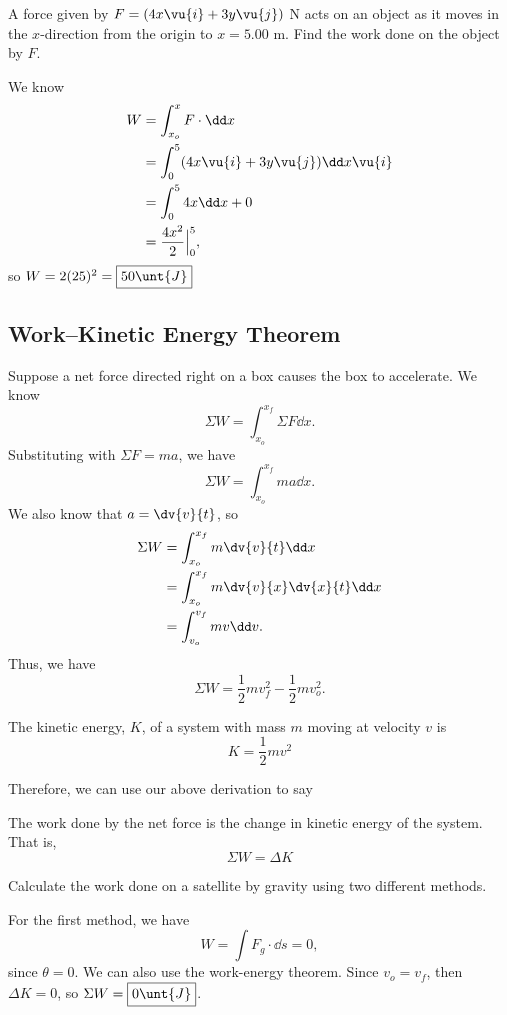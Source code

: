 \documentclass[11pt]{article}
\begin{document}
\begin{example}
	A force given by $F = (4x\vu{i} + 3y\vu{j})$ N acts on an object as it moves in the $x$-direction from the origin to $x = 5.00$ m. Find the work done on the object by $F$.
\end{example}
\begin{solution}
	We know
	\begin{align*}
		W &= \int_{x_o}^{x} F \cdot \dd x \\
		&= \int_0^5 (4x\vu{i} + 3y\vu{j}) \dd x \vu{i} \\
		&= \int_{0}^{5} 4x \dd x + 0 \\
		&= \frac{4x^2}{2} \Big|_0^5,
	\end{align*}
	so $W = 2(25)^2 = \boxed{50 \unt{J}}$
\end{solution}

\subsection{Work--Kinetic Energy Theorem}
Suppose a net force directed right on a box causes the box to accelerate. We know
\[\Sigma W = \int_{x_o}^{x_f} \Sigma F \dd x.\]
Substituting with $\Sigma F = ma$, we have
\[\Sigma W = \int_{x_o}^{x_f} ma \dd x.\]
We also know that $a = \dv{v}{t}$, so
\begin{align*}
	\Sigma W &= \int_{x_o}^{x_f} m \dv{v}{t} \dd x \\
	&= \int_{x_o}^{x_f} m \dv{v}{x} \dv{x}{t} \dd x \\
	&= \int_{v_o}^{v_f} mv \dd v.
\end{align*}
Thus, we have
\[\Sigma W = \frac{1}{2} mv_f^2 - \frac{1}{2} mv_o^2.\]
\begin{defn}
	The kinetic energy, $K$, of a system with mass $m$ moving at velocity $v$ is
	\[K = \frac{1}{2} mv^2\]
\end{defn}
Therefore, we can use our above derivation to say
\begin{thrm}
	The work done by the net force is the change in kinetic energy of the system. That is,
	\[\Sigma W = \Delta K\]
\end{thrm}
\begin{example}
	Calculate the work done on a satellite by gravity using two different methods.
\end{example}
\begin{solution}
	For the first method, we have
	\[W = \int F_g \cdot \dd s = 0,\]
	since $\theta = 0$. We can also use the work-energy theorem. Since $v_o = v_f$, then $\Delta K = 0$, so $\Sigma W = \boxed{0\unt{J}}$.
\end{solution}
\end{document}
